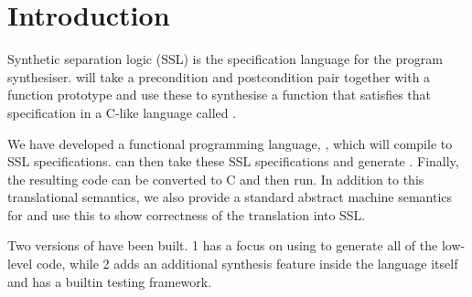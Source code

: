 \section{Introduction}

Synthetic separation logic (SSL) is the specification language for the \SuSLik{} program synthesiser. \SuSLik{} will take a precondition and postcondition pair together
with a function prototype and use these to synthesise a function that satisfies that specification in a C-like language called \SuSLang.

We have developed a  functional programming language, \Pika, which will compile to SSL specifications. \SuSLik{} can then take these SSL specifications and generate \SuSLang. Finally, the resulting \SuSLang{} code can be converted to C and then run. In addition to this translational semantics, we also provide a standard abstract machine semantics for \Pika{} and use this to show correctness of the translation into SSL.

Two versions of \Pika{} have been built. \Pika{} 1 has a focus on using \SuSLik{} to generate all of the low-level code, while \Pika{} 2 adds an additional synthesis feature inside the \Pika{} language itself and has a builtin testing framework.


